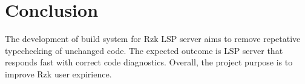 \documentclass[12pt, a4paper]{article}
\begin{document}
\section{Conclusion}
The development of build system for Rzk LSP server aims to remove repetative typechecking of unchanged code.
The expected outcome is LSP server that responds fast with correct code diagnostics.
Overall, the project purpose is to improve Rzk user expirience.



\end{document}
